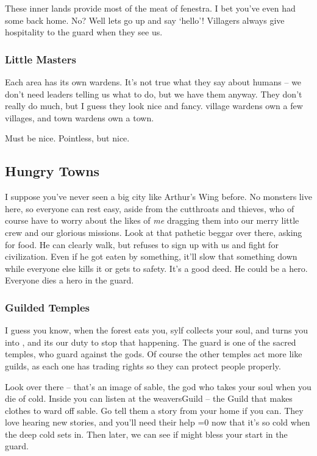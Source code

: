 \begin{multicols}{2}
\begin{exampletext}
  These inner lands provide most of the meat of \gls{fenestra}.
  I bet you've even had some back home.
  No?
  Well lets go up and say `hello'!
  Villagers always give hospitality to the \gls{guard} when they see us.

  \subsubsection*{Little Masters}

  Each area has its own \glspl{warden}.
  It's not true what they say about humans -- we don't need leaders telling us what to do, but we have them anyway.
  They don't really do much, but I guess they look nice and fancy.
  \Gls{village} \glspl{warden} own a few \glspl{village}, and town \glspl{warden} own a town.

  Must be nice.
  Pointless, but nice.

\subsection*{Hungry Towns}

  I suppose you've never seen a big city like Arthur's Wing before.
  No \glspl{monster} live here, so everyone can rest easy, aside from the cutthroats and thieves, who of course have to worry about the likes of \emph{me} dragging them into our merry little crew and our glorious missions.
  Look at that pathetic beggar over there, asking for food.
  He can clearly walk, but refuses to sign up with us and fight for civilization.
  Even if he got eaten by something, it'll slow that something down while everyone else kills it or gets to safety.
  It's a good deed.
  He could be a hero.
  Everyone dies a hero in the \gls{guard}.

  \subsubsection*{Guilded Temples}

  I guess you know, when the forest eats you, \gls{sylf} collects your soul, and turns you into , and its our duty to stop that happening.
  The \gls{guard} is one of the sacred temples, who guard against the gods.
  Of course the other temples act more like guilds, as each one has trading rights so they can protect people properly.

  Look over there -- that's an image of \gls{sable}, the god who takes your soul when you die of cold.
  Inside you can listen at the \gls{weaversGuild} -- the Guild that makes clothes to ward off \gls{sable}.
  Go tell them a story from your home if you can.
  They love hearing new stories, and you'll need their help \ifnum\value{temperature}=0 now that it's so cold \else when the deep cold sets in\fi.
  Then later, we can see if  might bless your start in the \gls{guard}.


\end{exampletext}
\end{multicols}
